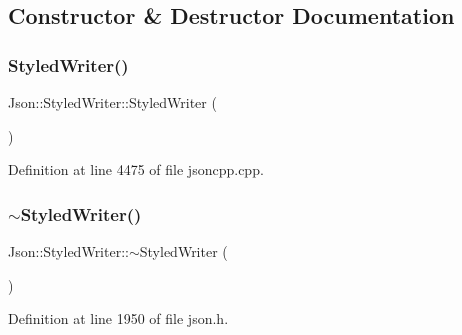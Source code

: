 \subsection{Constructor \& Destructor Documentation}
\hypertarget{class_json_1_1_styled_writer_a1f1b5f922a6a0ef0e56c6dd2f6170192}{}\label{class_json_1_1_styled_writer_a1f1b5f922a6a0ef0e56c6dd2f6170192} 
\subsubsection{\texorpdfstring{Styled\+Writer()}{StyledWriter()}\hspace{0.1cm}{\footnotesize\ttfamily [1/2]}}
{\footnotesize\ttfamily Json\+::\+Styled\+Writer\+::\+Styled\+Writer (\begin{DoxyParamCaption}{ }\end{DoxyParamCaption})}



Definition at line 4475 of file jsoncpp.\+cpp.

\hypertarget{class_json_1_1_styled_writer_a6a18380a4c5dd5e37a892dc182aac88c}{}\label{class_json_1_1_styled_writer_a6a18380a4c5dd5e37a892dc182aac88c} 
\subsubsection{\texorpdfstring{$\sim$\+Styled\+Writer()}{~StyledWriter()}\hspace{0.1cm}{\footnotesize\ttfamily [1/2]}}
{\footnotesize\ttfamily Json\+::\+Styled\+Writer\+::$\sim$\+Styled\+Writer (\begin{DoxyParamCaption}{ }\end{DoxyParamCaption})\hspace{0.3cm}{\ttfamily [inline]}}



Definition at line 1950 of file json.\+h.

\hypertarget{class_json_1_1_styled_writer_a1f1b5f922a6a0ef0e56c6dd2f6170192}{}\label{class_json_1_1_styled_writer_a1f1b5f922a6a0ef0e56c6dd2f6170192} 
